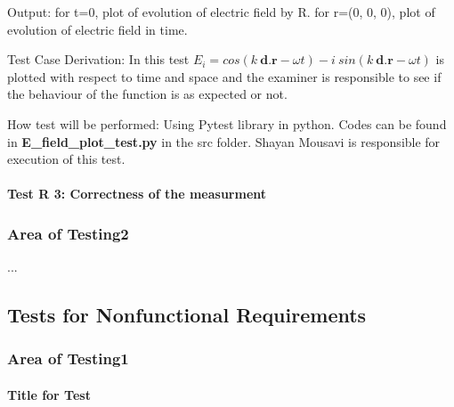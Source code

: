 \documentclass[12pt, titlepage]{article}
\begin{document}
\begin{enumerate}
Output: for t=0, plot of evolution of electric field by R. for r=(0, 0, 0), plot of evolution of electric field in time.

Test Case Derivation: In this test $E_i = cos(k\  \textbf{d.} \textbf{r} - \omega t) - i \ sin(k\  \textbf{d.} \textbf{r} - \omega t)$ is plotted with respect to time and space and the examiner is responsible to see if the behaviour of the function is as expected or not.   

How test will be performed: Using Pytest library in python. Codes can be found in \textbf{E\_field\_plot\_test.py } in the src folder. Shayan Mousavi is responsible for execution of this test. 

\paragraph{Test R 3: Correctness of the measurment}
	
	



	
	
\end{enumerate}



\subsubsection{Area of Testing2}

...

\subsection{Tests for Nonfunctional Requirements}
\label{nonfunc}



\subsubsection{Area of Testing1}
		
\paragraph{Title for Test}
\end{document}
